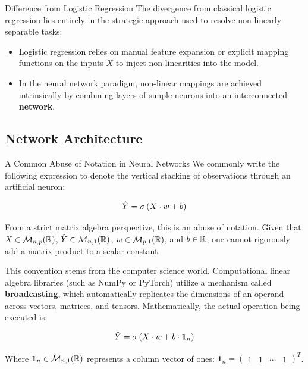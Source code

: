 \begin{frame}{Difference from Logistic Regression}
	The divergence from classical logistic regression lies entirely in the strategic approach used to resolve non-linearly separable tasks:
	\begin{itemize}
		\item Logistic regression relies on manual feature expansion or explicit mapping functions on the inputs $X$ to inject non-linearities into the model.
		\item In the neural network paradigm, non-linear mappings are achieved intrinsically by combining layers of simple neurons into an interconnected \textbf{network}.
	\end{itemize}
\end{frame}

\subsection[Network Architecture]{Network Architecture}

\begin{frame}{A Common Abuse of Notation in Neural Networks}
	We commonly write the following expression to denote the vertical stacking of observations through an artificial neuron:
	
	\begin{equation*}
		\hat{Y} = \operatorname{\sigma}\left(X \cdot w + b\right)
	\end{equation*}
	
	From a strict matrix algebra perspective, this is an abuse of notation. Given that $X \in \mathcal{M}_{n,p}(\mathbb{R})$, $\hat{Y} \in \mathcal{M}_{n,1}(\mathbb{R})$, $w \in \mathcal{M}_{p,1}(\mathbb{R})$, and $b \in \mathbb{R}$, one cannot rigorously add a matrix product to a scalar constant.
	
	\vspace{0.2cm}
	\pause
	
	This convention stems from the computer science world. Computational linear algebra libraries (such as NumPy or PyTorch) utilize a mechanism called \textbf{broadcasting}, which automatically replicates the dimensions of an operand across vectors, matrices, and tensors. Mathematically, the actual operation being executed is:
	
	\begin{equation*}
		\hat{Y} = \operatorname{\sigma}\left(X \cdot w + b \cdot \mathbf{1}_n\right)
	\end{equation*}
	
	Where $\mathbf{1}_n \in \mathcal{M}_{n,1}(\mathbb{R})$ represents a column vector of ones: $\mathbf{1}_n = \begin{pmatrix} 1 & 1 & \cdots & 1 \end{pmatrix}^T$.
\end{frame}

